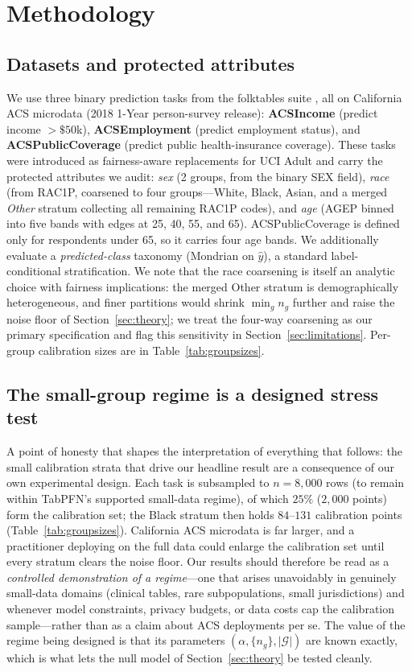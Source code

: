 \documentclass[review,12pt]{elsarticle}
\begin{document}
\section{Methodology}
\label{sec:method}

\subsection{Datasets and protected attributes}
We use three binary prediction tasks from the folktables suite \cite{ding2021}, all on California ACS microdata (2018 1-Year person-survey release): \textbf{ACSIncome} (predict income $>\$50$k), \textbf{ACSEmployment} (predict employment status), and \textbf{ACSPublicCoverage} (predict public health-insurance coverage). These tasks were introduced as fairness-aware replacements for UCI Adult and carry the protected attributes we audit: \emph{sex} (2 groups, from the binary SEX field), \emph{race} (from RAC1P, coarsened to four groups---White, Black, Asian, and a merged \emph{Other} stratum collecting all remaining RAC1P codes), and \emph{age} (AGEP binned into five bands with edges at 25, 40, 55, and 65). ACSPublicCoverage is defined only for respondents under 65, so it carries four age bands. We additionally evaluate a \emph{predicted-class} taxonomy (Mondrian on $\hat y$), a standard label-conditional stratification. We note that the race coarsening is itself an analytic choice with fairness implications: the merged Other stratum is demographically heterogeneous, and finer partitions would shrink $\min_g n_g$ further and raise the noise floor of Section~\ref{sec:theory}; we treat the four-way coarsening as our primary specification and flag this sensitivity in Section~\ref{sec:limitations}. Per-group calibration sizes are in Table~\ref{tab:groupsizes}.

\subsection{The small-group regime is a designed stress test}
\label{sec:designed}
A point of honesty that shapes the interpretation of everything that follows: the small calibration strata that drive our headline result are a consequence of our own experimental design. Each task is subsampled to $n=8{,}000$ rows (to remain within TabPFN's supported small-data regime), of which $25\%$ ($2{,}000$ points) form the calibration set; the Black stratum then holds $84$--$131$ calibration points (Table~\ref{tab:groupsizes}). California ACS microdata is far larger, and a practitioner deploying on the full data could enlarge the calibration set until every stratum clears the noise floor. Our results should therefore be read as a \emph{controlled demonstration of a regime}---one that arises unavoidably in genuinely small-data domains (clinical tables, rare subpopulations, small jurisdictions) and whenever model constraints, privacy budgets, or data costs cap the calibration sample---rather than as a claim about ACS deployments per se. The value of the regime being designed is that its parameters $(\alpha, \{n_g\}, |\mathcal{G}|)$ are known exactly, which is what lets the null model of Section~\ref{sec:theory} be tested cleanly.
\end{document}
